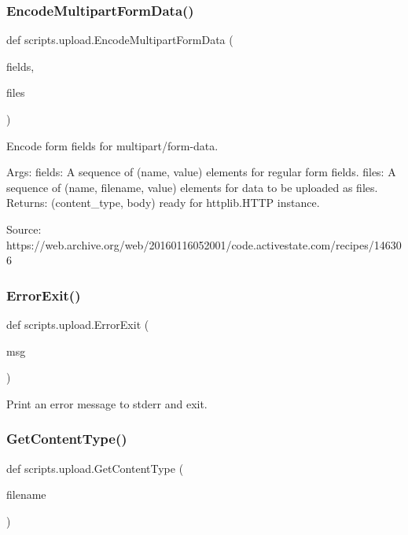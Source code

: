 \subsubsection{\texorpdfstring{EncodeMultipartFormData()}{EncodeMultipartFormData()}}
{\footnotesize\ttfamily def scripts.\+upload.\+Encode\+Multipart\+Form\+Data (\begin{DoxyParamCaption}\item[{}]{fields,  }\item[{}]{files }\end{DoxyParamCaption})}

\begin{DoxyVerb}Encode form fields for multipart/form-data.

Args:
  fields: A sequence of (name, value) elements for regular form fields.
  files: A sequence of (name, filename, value) elements for data to be
         uploaded as files.
Returns:
  (content_type, body) ready for httplib.HTTP instance.

Source:
  https://web.archive.org/web/20160116052001/code.activestate.com/recipes/146306
\end{DoxyVerb}
 \mbox{\label{namespacescripts_1_1upload_ab2db40450ce1b1ab568a4efd17e1dff1}} 
\subsubsection{\texorpdfstring{ErrorExit()}{ErrorExit()}}
{\footnotesize\ttfamily def scripts.\+upload.\+Error\+Exit (\begin{DoxyParamCaption}\item[{}]{msg }\end{DoxyParamCaption})}

\begin{DoxyVerb}Print an error message to stderr and exit.\end{DoxyVerb}
 \mbox{\label{namespacescripts_1_1upload_a3f284319cff3bfc3d17c11a14fcd9f83}} 
\subsubsection{\texorpdfstring{GetContentType()}{GetContentType()}}
{\footnotesize\ttfamily def scripts.\+upload.\+Get\+Content\+Type (\begin{DoxyParamCaption}\item[{}]{filename }\end{DoxyParamCaption})}

